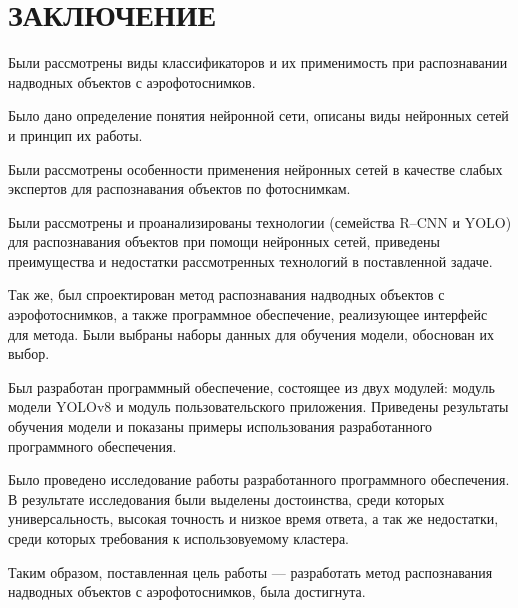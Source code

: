 \chapter*{ЗАКЛЮЧЕНИЕ}

Были рассмотрены виды классификаторов и их применимость при распознавании надводных объектов с аэрофотоснимков.

Было дано определение понятия нейронной сети, описаны виды нейронных сетей и принцип их работы.

Были рассмотрены особенности применения нейронных сетей в качестве слабых экспертов для распознавания объектов по фотоснимкам.

Были рассмотрены и проанализированы технологии (семейства R–CNN и YOLO) для распознавания объектов при помощи нейронных сетей, приведены преимущества и недостатки рассмотренных технологий в поставленной задаче.

Так же, был спроектирован метод распознавания надводных объектов с аэрофотоснимков, а также программное обеспечение, реализующее интерфейс для метода. Были выбраны наборы данных для обучения модели, обоснован их выбор.

Был разработан программный обеспечение, состоящее из двух модулей: модуль модели YOLOv8 и модуль пользовательского приложения. Приведены результаты обучения модели и показаны примеры использования разработанного программного обеспечения.

Было проведено исследование работы разработанного программного обеспечения. В результате исследования были выделены достоинства, среди которых универсальность, высокая точность и низкое время ответа, а так же недостатки, среди которых требования к использовуемому кластера.

Таким образом, поставленная цель работы --- разработать метод распознавания надводных объектов с аэрофотоснимков, была достигнута.